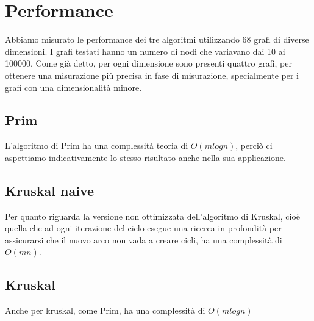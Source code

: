 \section{Performance}
Abbiamo misurato le performance dei tre algoritmi utilizzando 68 grafi di diverse dimensioni.
I grafi testati hanno un numero di nodi che variavano dai  10 ai 100000.
Come già detto, per ogni dimensione sono presenti quattro grafi, per ottenere una misurazione più precisa in fase di misurazione, specialmente per i grafi con una dimensionalità minore.
\subsection{Prim}
L'algoritmo di Prim ha una complessità teoria di $O(mlogn)$, perciò ci aspettiamo indicativamente lo stesso risultato anche nella sua applicazione.
\subsection{Kruskal naive}
Per quanto riguarda la versione non ottimizzata dell'algoritmo di Kruskal, cioè quella che ad ogni iterazione del ciclo esegue una ricerca in profondità per assicurarsi che il nuovo arco non vada a creare cicli, ha una complessità di $O(mn)$.
\subsection{Kruskal}
Anche per kruskal, come Prim, ha una complessità di $O(mlogn)$
